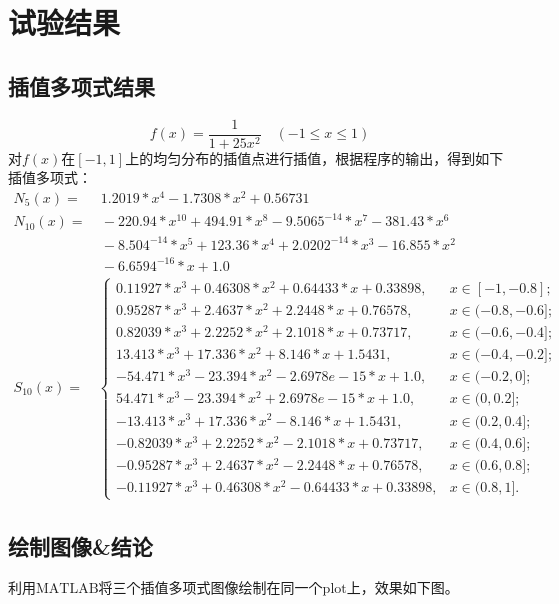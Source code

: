 \documentclass[12pt, a4paper, oneside]{ctexart}
\begin{document}
\section{试验结果}
\subsection{插值多项式结果}
\begin{equation*}
    f(x) = \frac{1}{1+25x^2}\quad (-1\leqslant x\leqslant 1)
\end{equation*}
对$f(x)$在$[-1,1]$上的均匀分布的插值点进行插值，根据程序的输出，得到如下插值多项式：
\begin{equation*}
    \begin{aligned}
        N_5(x) =&\ 1.2019*x^4 - 1.7308*x^2 + 0.56731\\
        N_{10}(x) =&\  - 220.94*x^{10} + 494.91*x^8 - 9.5065^{-14}*x^7 - 381.43*x^6\\
        &\  - 8.504^{-14}*x^5 + 123.36*x^4 + 2.0202^{-14}*x^3 - 16.855*x^2\\
        &\ - 6.6594^{-16}*x + 1.0\\
        S_{10}(x) =& \begin{cases}
            0.11927*x^3 + 0.46308*x^2 + 0.64433*x + 0.33898,&x\in[-1,-0.8];\\
            0.95287*x^3 + 2.4637*x^2 + 2.2448*x + 0.76578,&x\in(-0.8,-0.6];\\
            0.82039*x^3 + 2.2252*x^2 + 2.1018*x + 0.73717,&x\in(-0.6,-0.4];\\
            13.413*x^3 + 17.336*x^2 + 8.146*x + 1.5431,&x\in(-0.4,-0.2];\\
            - 54.471*x^3 - 23.394*x^2 - 2.6978e-15*x + 1.0,&x\in(-0.2,0];\\
            54.471*x^3 - 23.394*x^2 + 2.6978e-15*x + 1.0,&x\in(0,0.2];\\
            - 13.413*x^3 + 17.336*x^2 - 8.146*x + 1.5431,&x\in(0.2,0.4];\\
            - 0.82039*x^3 + 2.2252*x^2 - 2.1018*x + 0.73717,&x\in(0.4,0.6];\\
            - 0.95287*x^3 + 2.4637*x^2 - 2.2448*x + 0.76578,&x\in(0.6,0.8];\\
            - 0.11927*x^3 + 0.46308*x^2 - 0.64433*x + 0.33898,&x\in(0.8,1].
        \end{cases}
    \end{aligned}
\end{equation*}
\subsection{绘制图像\&结论}
利用$\text{MATLAB}$将三个插值多项式图像绘制在同一个$\text{plot}$上，效果如下图。
\end{document}

